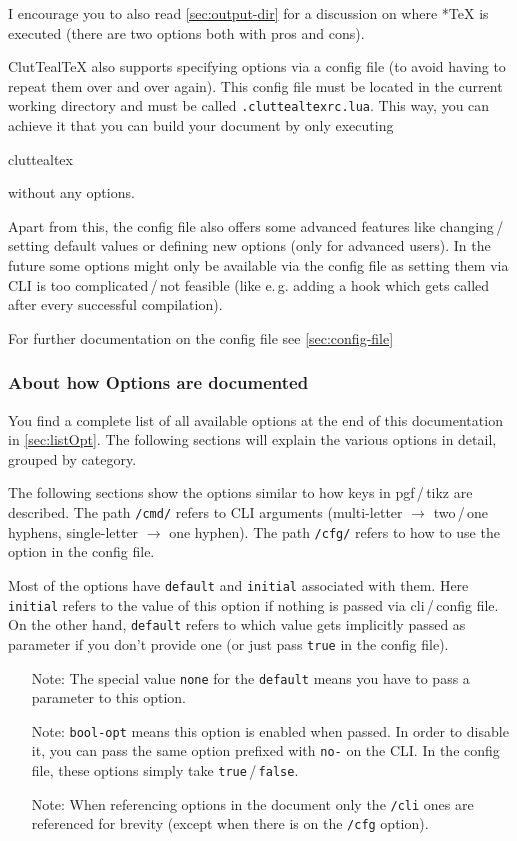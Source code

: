 \documentclass[a4paper, 11pt]{scrartcl}
\newcommand\eg{e.\,g.\xspace}
\newcommand\tos{$\to$\xspace}
\let\TeXold\TeX
\newcommand\CluttealTeX{ClutTeal\TeX\xspace}
\renewcommand\TeX{\TeXold\xspace}
\begin{document}
I encourage you to also read \cref{sec:output-dir} for a discussion on where *\TeX is executed (there are two options both with pros and cons).

\CluttealTeX also supports specifying options via a config file (to avoid having to repeat them over and over again).
This config file must be located in the current working directory and must be called \texttt{.cluttealtexrc.lua}.
This way, you can achieve it that you can build your document by only executing
\begin{boxcode}[none][\normalsize]
cluttealtex
\end{boxcode}
without any options.

Apart from this, the config file also offers some advanced features like changing\,/\,setting default values or defining new options (only for advanced users).
In the future some options might only be available via the config file as setting them via CLI is too complicated\,/\,not feasible (like \eg adding a hook which gets called after every successful compilation).

For further documentation on the config file see \cref{sec:config-file}

\subsubsection{About how Options are documented} \label{sec:opt-doc}

You find a complete list of all available options at the end of this documentation in \cref{sec:listOpt}.
The following sections will explain the various options in detail, grouped by category.

The following sections show the options similar to how keys in pgf\,/\,tikz are described.
The path \texttt{/cmd/} refers to CLI arguments (multi-letter \tos two\,/\,one hyphens, single-letter \tos one hyphen).
The path \texttt{/cfg/} refers to how to use the option in the config file.

Most of the options have \texttt{default} and \texttt{initial} associated with them.
Here \texttt{initial} refers to the value of this option if nothing is passed via cli\,/\,config file.
On the other hand, \texttt{default} refers to which value gets implicitly passed as parameter if you don't provide one (or just pass \texttt{true} in the config file).

\begin{itemize}
	\item[Note:] The special value \texttt{none} for the \texttt{default} means you have to pass a parameter to this option.
	\item[Note:] \texttt{bool-opt} means this option is enabled when passed.
		In order to disable it, you can pass the same option prefixed with \texttt{no-} on the CLI.
		In the config file, these options simply take \texttt{true}\,/\,\texttt{false}.
	\item[Note:] When referencing options in the document only the \texttt{/cli} ones are referenced for brevity (except when there is on the \texttt{/cfg} option).
\end{itemize}
\end{document}
